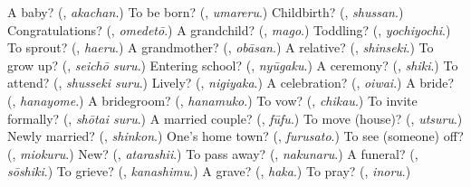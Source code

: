 \begin{tcolorbox}[breakable,colback=teal!4,colframe=teal!35!black,title={Before you move on}]
A baby? (\textbf{}, \emph{akachan}.) To be born? (\textbf{}, \emph{umareru}.) Childbirth? (\textbf{}, \emph{shussan}.) Congratulations? (\textbf{}, \emph{omedetō}.) A grandchild? (\textbf{}, \emph{mago}.) Toddling? (\textbf{}, \emph{yochiyochi}.) To sprout? (\textbf{}, \emph{haeru}.) A grandmother? (\textbf{}, \emph{obāsan}.) A relative? (\textbf{}, \emph{shinseki}.) To grow up? (\textbf{}, \emph{seichō suru}.) Entering school? (\textbf{}, \emph{nyūgaku}.) A ceremony? (\textbf{}, \emph{shiki}.) To attend? (\textbf{}, \emph{shusseki suru}.) Lively? (\textbf{}, \emph{nigiyaka}.) A celebration? (\textbf{}, \emph{oiwai}.) A bride? (\textbf{}, \emph{hanayome}.) A bridegroom? (\textbf{}, \emph{hanamuko}.) To vow? (\textbf{}, \emph{chikau}.) To invite formally? (\textbf{}, \emph{shōtai suru}.) A married couple? (\textbf{}, \emph{fūfu}.) To move (house)? (\textbf{}, \emph{utsuru}.) Newly married? (\textbf{}, \emph{shinkon}.) One's home town? (\textbf{}, \emph{furusato}.) To see (someone) off? (\textbf{}, \emph{miokuru}.) New? (\textbf{}, \emph{atarashii}.) To pass away? (\textbf{}, \emph{nakunaru}.) A funeral? (\textbf{}, \emph{sōshiki}.) To grieve? (\textbf{}, \emph{kanashimu}.) A grave? (\textbf{}, \emph{haka}.) To pray? (\textbf{}, \emph{inoru}.)
\end{tcolorbox}

